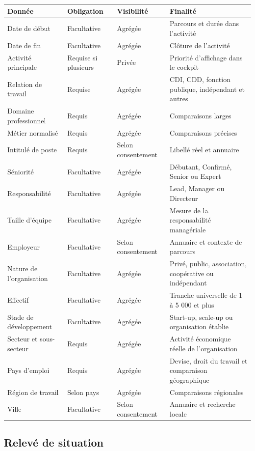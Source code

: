 \documentclass[11pt,a4paper]{article}
\begin{document}
\begin{longtable}{@{}L{43mm}L{30mm}L{28mm}L{65mm}@{}}
  \toprule
  \textbf{Donnée} & \textbf{Obligation} & \textbf{Visibilité} & \textbf{Finalité} \\
  \midrule
  \endhead
  Date de début & Facultative & Agrégée & Parcours et durée dans l'activité \\
  Date de fin & Facultative & Agrégée & Clôture de l'activité \\
  Activité principale & Requise si plusieurs & Privée & Priorité d'affichage dans le cockpit \\
  Relation de travail & Requise & Agrégée & CDI, CDD, fonction publique, indépendant et autres \\
  Domaine professionnel & Requis & Agrégée & Comparaisons larges \\
  Métier normalisé & Requis & Agrégée & Comparaisons précises \\
  Intitulé de poste & Requis & Selon consentement & Libellé réel et annuaire \\
  Séniorité & Facultative & Agrégée & Débutant, Confirmé, Senior ou Expert \\
  Responsabilité & Facultative & Agrégée & Lead, Manager ou Directeur \\
  Taille d'équipe & Facultative & Agrégée & Mesure de la responsabilité managériale \\
  Employeur & Facultative & Selon consentement & Annuaire et contexte de parcours \\
  Nature de l'organisation & Facultative & Agrégée & Privé, public, association, coopérative ou indépendant \\
  Effectif & Facultative & Agrégée & Tranche universelle de 1 à 5 000 et plus \\
  Stade de développement & Facultative & Agrégée & Start-up, scale-up ou organisation établie \\
  Secteur et sous-secteur & Requis & Agrégée & Activité économique réelle de l'organisation \\
  Pays d'emploi & Requis & Agrégée & Devise, droit du travail et comparaison géographique \\
  Région de travail & Selon pays & Agrégée & Comparaisons régionales \\
  Ville & Facultative & Selon consentement & Annuaire et recherche locale \\
  \bottomrule
\end{longtable}

\subsection{Relevé de situation}
\end{document}
